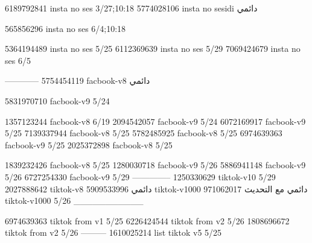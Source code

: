 
6189792841 insta no ses
3/27;10:18
5774028106 insta no sesidi
دائمي


565856296 insta no ses
6/4;10:18


5364194489 insta no ses
5/25
6112369639 insta no ses
5/29
7069424679 insta no ses
6/5

------------
5754454119 facbook-v8
دائمي

5831970710 facbook-v9
5/24

1357123244 facbook-v8
6/19
2094542057 facbook-v9
5/24
6072169917 facbook-v9
5/25
7139337944 facbook-v8
5/25
5782485925 facbook-v8
5/25
6974639363 facbook-v9
5/25
2025372898 facbook-v8
5/25

1839232426 facbook-v8
5/25
1280030718 facbook-v9
5/26
5886941148 facbook-v9
5/26
6727254330 facbook-v9
5/29
--------------
1250330629 tiktok-v10
5/29
2027888642 tiktok-v8
دائمي
5909533996 tiktok-v1000
دائمي مع التحديث
971062017 tiktok-v1000
5/26
___________

6974639363 tiktok from v1
5/25
6226424544 tiktok from v2
5/26
1808696672 tiktok from v2
5/26
---------
1610025214 list tiktok v5
5/25
